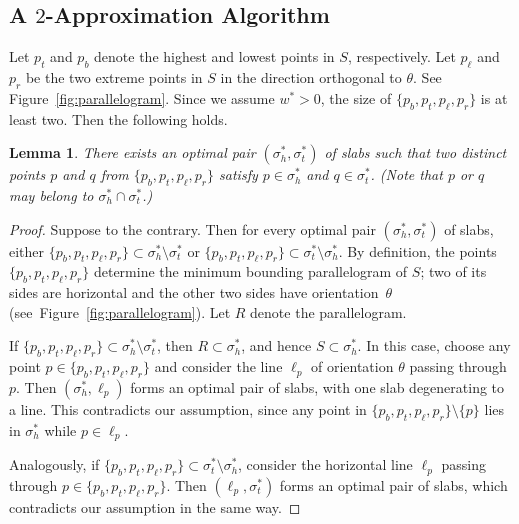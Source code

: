 \documentclass[10pt,a4paper]{article}
\newtheorem{lemma}[theorem]{Lemma}
\theoremstyle{star}
\theoremstyle{claimstar}
\begin{document}
\subsection{A \texorpdfstring{$2$}{2}-Approximation Algorithm}
\label{sec:2_apx_two_fixed}

Let $p_t$ and $p_b$ denote the highest and lowest points in $S$, respectively.
Let $p_\ell$ and $p_r$ be the two extreme points in $S$ in the direction orthogonal to $\theta$. See Figure~\ref{fig:parallelogram}. 
Since we assume $w^* > 0$, the size of $\{p_b, p_t, p_\ell, p_r\}$ is at least two.
Then the following holds.


\begin{lemma}
    \label{lem:two_fixed_extreme_pts}
    There exists an optimal pair $(\sigma_h^*, \sigma_t^*)$ of slabs such that two distinct points $p$ and $q$ from $\{p_b, p_t, p_\ell, p_r\}$ satisfy $p \in \sigma_h^*$ and $q \in \sigma_t^*$.
    (Note that $p$ or $q$ may belong to $\sigma_h^* \cap \sigma_t^*$.)
\end{lemma}
\begin{proof}
    Suppose to the contrary. 
    Then for every optimal pair $(\sigma_h^*, \sigma_t^*)$ of slabs, either $\{p_b, p_t, p_\ell, p_r\} \subset \sigma_h^* \setminus \sigma_t^*$ or $\{p_b, p_t, p_\ell, p_r\} \subset \sigma_t^* \setminus \sigma_h^*$.
    By definition, the points $\{p_b, p_t, p_\ell, p_r\}$ determine the minimum bounding parallelogram of $S$; two of its sides are horizontal and the other two sides have orientation~$\theta$ (see~Figure~\ref{fig:parallelogram}). 
    Let $R$ denote the parallelogram. 
    
    If $\{p_b, p_t, p_\ell, p_r\} \subset \sigma_h^* \setminus \sigma_t^*$, then $R \subset \sigma_h^*$, and hence $S \subset \sigma_h^*$.
    In this case, choose any point $p \in \{p_b, p_t, p_\ell, p_r\}$ and consider the line $\ell_p$ of orientation $\theta$ passing through $p$. 
    Then $(\sigma_h^*, \ell_p)$ forms an optimal pair of slabs, with one slab degenerating to a line.
    This contradicts our assumption, since any point in $\{p_b, p_t, p_\ell, p_r\}\setminus\{p\}$ lies in $\sigma_h^*$ while $p \in \ell_p$.
    
    Analogously, if $\{p_b, p_t, p_\ell, p_r\} \subset \sigma_t^* \setminus \sigma_h^*$, consider the horizontal line $\ell_p$ passing through $p \in \{p_b, p_t, p_\ell, p_r\}$.
    Then $(\ell_p, \sigma_t^*)$ forms an optimal pair of slabs, which contradicts our assumption in the same way.
\end{proof}
\end{document}
